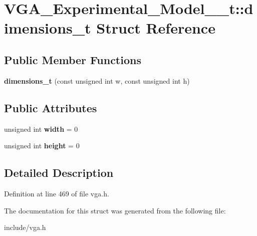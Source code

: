 \hypertarget{structVGA__Experimental__Model__1__t_1_1dimensions__t}{\section{V\-G\-A\-\_\-\-Experimental\-\_\-\-Model\-\_\-\_\-t\-:\-:dimensions\-\_\-t Struct Reference}
\label{structVGA__Experimental__Model__1__t_1_1dimensions__t}
}
\subsection*{Public Member Functions}
\begin{DoxyCompactItemize}
\item 
\hypertarget{structVGA__Experimental__Model__1__t_1_1dimensions__t_abf263ecb63055db8f2ed54cf3754bd4f}{{\bfseries dimensions\-\_\-t} (const unsigned int w, const unsigned int h)}\label{structVGA__Experimental__Model__1__t_1_1dimensions__t_abf263ecb63055db8f2ed54cf3754bd4f}

\end{DoxyCompactItemize}
\subsection*{Public Attributes}
\begin{DoxyCompactItemize}
\item 
\hypertarget{structVGA__Experimental__Model__1__t_1_1dimensions__t_a64e3b7bbe033b1ad70268147d366538c}{unsigned int {\bfseries width} = 0}\label{structVGA__Experimental__Model__1__t_1_1dimensions__t_a64e3b7bbe033b1ad70268147d366538c}

\item 
\hypertarget{structVGA__Experimental__Model__1__t_1_1dimensions__t_a24dea628a7bfc2a8fe7e66a3615b0d9f}{unsigned int {\bfseries height} = 0}\label{structVGA__Experimental__Model__1__t_1_1dimensions__t_a24dea628a7bfc2a8fe7e66a3615b0d9f}

\end{DoxyCompactItemize}


\subsection{Detailed Description}


Definition at line 469 of file vga.\-h.



The documentation for this struct was generated from the following file\-:\begin{DoxyCompactItemize}
\item 
include/vga.\-h\end{DoxyCompactItemize}

